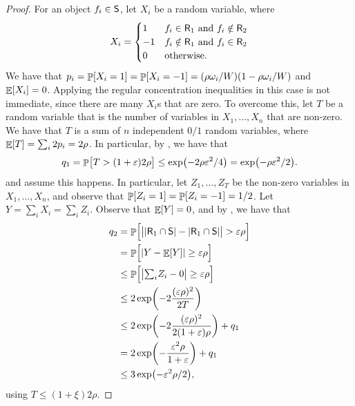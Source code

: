 \begin{proof}
    For an object $f_i \in \mathsf{S}$, let $X_i$ be a random 
    variable, where
    \begin{equation*}
        X_i = \begin{cases}
            1 & f_i \in \mathsf{R}_1 \text{ and } f_i \notin
            \mathsf{R}_2\\
            -1 & f_i \notin \mathsf{R}_1 \text{ and } f_i \in
            \mathsf{R}_2\\
            0 & \text{otherwise.}
        \end{cases}
    \end{equation*}
    We have that
    $p_i = \Prob{X_i = 1} = \Prob{X_i=-1} = (\rho \Wg_i / \TotalW)( 1-
    \rho \Wg_i / \TotalW)$ and $\mathop{\mathbb{E}}\!\left[ {X_i} \right] = 0$. Applying the regular
    concentration inequalities in this case is not immediate, since
    there are many $X_i$s that are zero. To overcome this, let $T$ be
    a random variable that is the number of variables in
    $X_1, \ldots, X_n$ that are non-zero. We have that $T$ is a sum of
    $n$ independent $0/1$ random variables, where
    $\mathop{\mathbb{E}}\!\left[ {T} \right] = \sum_i 2p_i =2 \rho$. In particular, by
    , we have
    that
    \begin{equation*}
        q_1 = \Prob{\bigl. T  > (1+\eps) 2 \rho}%
        \leq%
        \exp\pth{ \bigl.- 2\rho\eps^2 /4}
        =%
        \exp\pth{ \bigl.- \rho\eps^2 /2}.
    \end{equation*}
    and assume this happens.  In particular, let $Z_1, \ldots, Z_T$ be
    the non-zero variables in $X_1,\ldots, X_n$, and observe that
    $\Prob{Z_i=1} = \Prob{Z_i=-1} = 1/2$.  Let
    $Y=\sum_i X_i = \sum_i Z_i$. Observe that $\mathop{\mathbb{E}}\!\left[ {Y} \right] = 0$, and by
    , we have that
    \begin{align*}
      q_2%
      &=%
        \Prob{\Bigl.
        \cardin{\bigl.\cardin{\Sample_1 \cap \ObjSet} - \cardin{\Sample_1
        \cap \ObjSet} }%
        > %
        \eps \rho
        }
      \\&
        =%
        \Prob{\Bigl. \cardin{Y - \Ex{Y}} \geq \eps \rho}
      \\&
        \leq%
        \Prob{\Bigl. \cardin{\bigl.\textstyle{\sum}_i Z_i - 0} \geq
        \eps \rho}
      \\%
      &
        \leq%
        2 \exp\pth{ - 2 \frac{ (\eps \rho)^2 }{2T}}
      \\&
        \leq%
        2 \exp\pth{ - 2 \frac{ (\eps \rho)^2 }{2(1+\eps)\rho}} + q_1
      \\&
        =%
        2 \exp\pth{ -  \frac{ \eps^2 \rho }{1+\eps}} + q_1
      \\&
        \leq%
        3 \exp\pth{ -   \eps^2 \rho/2 },
    \end{align*}
    using $T \leq (1+\xi)2\rho$.
\end{proof}



